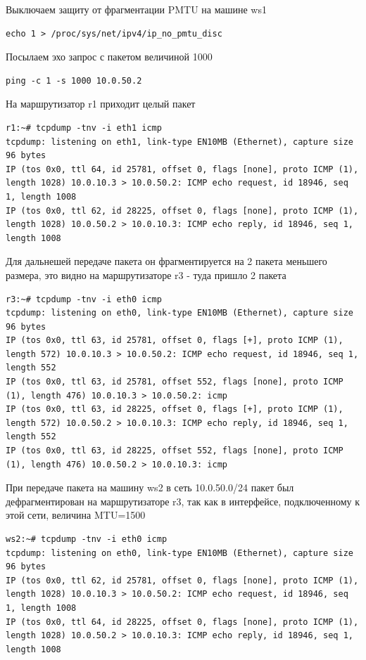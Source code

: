 \documentclass[a4paper,12pt]{article}
\begin{document}
Выключаем защиту от фрагментации PMTU на машине ws1

\begin{Verbatim}
echo 1 > /proc/sys/net/ipv4/ip_no_pmtu_disc
\end{Verbatim}

Посылаем эхо запрос с пакетом величиной 1000 

\begin{Verbatim}
ping -c 1 -s 1000 10.0.50.2
\end{Verbatim}

На маршрутизатор r1 приходит целый пакет

\begin{Verbatim}
r1:~# tcpdump -tnv -i eth1 icmp
tcpdump: listening on eth1, link-type EN10MB (Ethernet), capture size 96 bytes
IP (tos 0x0, ttl 64, id 25781, offset 0, flags [none], proto ICMP (1), length 1028) 10.0.10.3 > 10.0.50.2: ICMP echo request, id 18946, seq 1, length 1008
IP (tos 0x0, ttl 62, id 28225, offset 0, flags [none], proto ICMP (1), length 1028) 10.0.50.2 > 10.0.10.3: ICMP echo reply, id 18946, seq 1, length 1008
\end{Verbatim}

Для дальнешей передаче пакета он фрагментируется на 2 пакета меньшего размера, это видно на маршрутизаторе r3 - туда пришло 2 пакета

\begin{Verbatim}
r3:~# tcpdump -tnv -i eth0 icmp
tcpdump: listening on eth0, link-type EN10MB (Ethernet), capture size 96 bytes
IP (tos 0x0, ttl 63, id 25781, offset 0, flags [+], proto ICMP (1), length 572) 10.0.10.3 > 10.0.50.2: ICMP echo request, id 18946, seq 1, length 552
IP (tos 0x0, ttl 63, id 25781, offset 552, flags [none], proto ICMP (1), length 476) 10.0.10.3 > 10.0.50.2: icmp
IP (tos 0x0, ttl 63, id 28225, offset 0, flags [+], proto ICMP (1), length 572) 10.0.50.2 > 10.0.10.3: ICMP echo reply, id 18946, seq 1, length 552
IP (tos 0x0, ttl 63, id 28225, offset 552, flags [none], proto ICMP (1), length 476) 10.0.50.2 > 10.0.10.3: icmp
\end{Verbatim}
При передаче пакета на машину ws2 в сеть 10.0.50.0/24 пакет был дефрагментирован на маршрутизаторе r3, так как в интерфейсе, подключенному к этой сети, величина MTU=1500

\begin{Verbatim}
ws2:~# tcpdump -tnv -i eth0 icmp
tcpdump: listening on eth0, link-type EN10MB (Ethernet), capture size 96 bytes
IP (tos 0x0, ttl 62, id 25781, offset 0, flags [none], proto ICMP (1), length 1028) 10.0.10.3 > 10.0.50.2: ICMP echo request, id 18946, seq 1, length 1008
IP (tos 0x0, ttl 64, id 28225, offset 0, flags [none], proto ICMP (1), length 1028) 10.0.50.2 > 10.0.10.3: ICMP echo reply, id 18946, seq 1, length 1008
\end{Verbatim}
\end{document}

